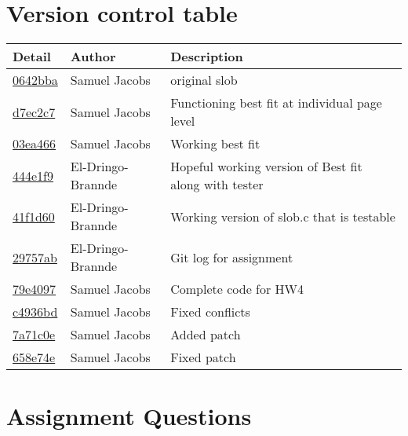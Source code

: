 \documentclass{article}
\begin{document}
\section{Version control table}
    \begin{tabular}{l l l}\textbf{Detail} & \textbf{Author} & \textbf{Description}\\\hline
\href{https://github.com/El-Dringo-Brannde/CS444/commit/0642bba1376147e426fdc24b35a3f4514ca64128}{0642bba} & Samuel Jacobs & original slob\\\hline
\href{https://github.com/El-Dringo-Brannde/CS444/commit/d7ec2c7e441dfaf6f47bebabb1de7145c4dd78d8}{d7ec2c7} & Samuel Jacobs & Functioning best fit at individual page level\\\hline
\href{https://github.com/El-Dringo-Brannde/CS444/commit/03ea466f04de4ab8f9afb953e122acbde9ca1605}{03ea466} & Samuel Jacobs & Working best fit\\\hline
\href{https://github.com/El-Dringo-Brannde/CS444/commit/444e1f9b456561bbe0ce082c67e0670c410c6252}{444e1f9} & El-Dringo-Brannde & Hopeful working version of Best fit along with tester\\\hline
\href{https://github.com/El-Dringo-Brannde/CS444/commit/41f1d60a1975f46fbea3689fae9bca8010b026b3}{41f1d60} & El-Dringo-Brannde & Working version of slob.c that is testable\\\hline
\href{https://github.com/El-Dringo-Brannde/CS444/commit/29757abf2155c4200641676e72d3e776c035a28a}{29757ab} & El-Dringo-Brannde & Git log for assignment\\\hline
\href{https://github.com/El-Dringo-Brannde/CS444/commit/79e4097ef505f2c97d9c970641e20f37e710bc5d}{79e4097} & Samuel Jacobs & Complete code for HW4\\\hline
\href{https://github.com/El-Dringo-Brannde/CS444/commit/c4936bd97c2f104a36353c3194a786193bce7ead}{c4936bd} & Samuel Jacobs & Fixed conflicts\\\hline
\href{https://github.com/El-Dringo-Brannde/CS444/commit/7a71c0e879215732f79893c4d7df977422d26e86}{7a71c0e} & Samuel Jacobs & Added patch\\\hline
\href{https://github.com/El-Dringo-Brannde/CS444/commit/658e74e41e355d426a7a1fbd51c89f2859b0c7fe}{658e74e} & Samuel Jacobs & Fixed patch\\\hline\end{tabular}


\section{Assignment Questions}
\end{document}
